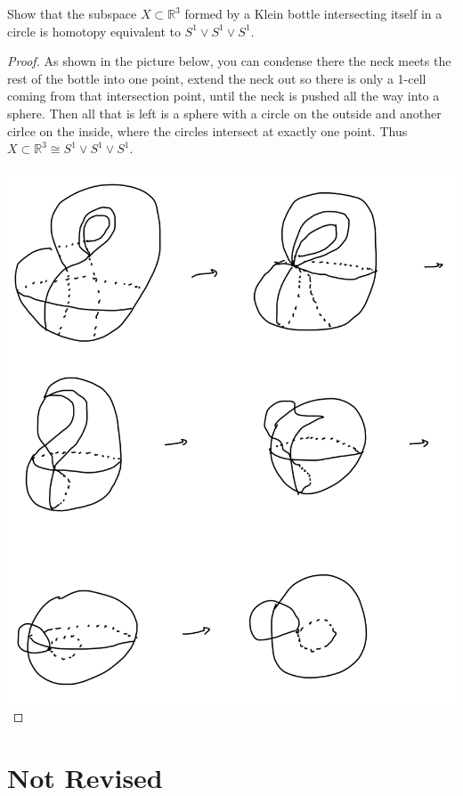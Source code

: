 \documentclass[12pt]{article}
\newenvironment{statement}[2][Statement]{\begin{trivlist}
\item[\hskip \labelsep {\bfseries #1}\hskip \labelsep {\bfseries #2.}]}{\end{trivlist}}
\begin{document}
\begin{statement}[Exercise]{0.20}
    Show that the subspace $X \subset \mathbb{R}^3$ formed by a Klein bottle intersecting itself in a circle is homotopy equivalent to $S^1 \vee S^1 \vee S^1$.
\end{statement}
\begin{proof}
    As shown in the picture below, you can condense there the neck meets the rest of the bottle into one point, extend the neck out so there is only a 1-cell coming from that intersection point, until the neck is pushed all the way into a sphere. Then all that is left is a sphere with a circle on the outside and another cirlce on the inside, where the circles intersect at exactly one point. Thus $X \subset \mathbb{R}^3 \cong S^1 \vee S^1 \vee S^1$.
    \par \includegraphics[scale=.3]{1.20.jpg}
\end{proof}

\section{Not Revised}
\end{document}
